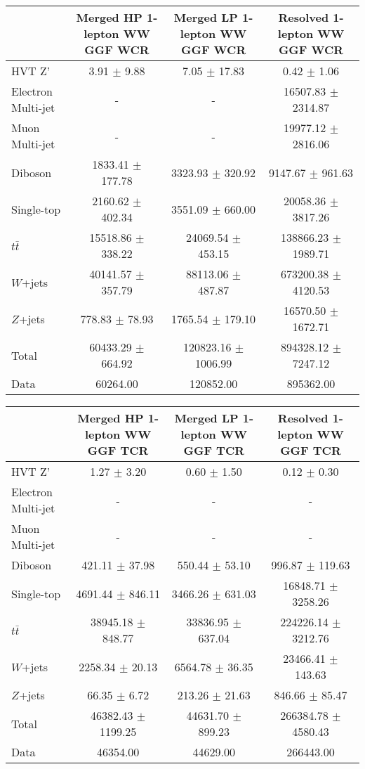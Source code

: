 
\begin{tabular}{|l|c|c|c|}
\hline
	  &	Merged HP 1-lepton WW GGF WCR &	Merged LP 1-lepton WW GGF WCR &	Resolved 1-lepton WW GGF WCR \\\hline 
	HVT Z' &	3.91 $\pm$ 9.88 &	7.05 $\pm$ 17.83 &	0.42 $\pm$ 1.06 \\\hline 
	Electron Multi-jet &	- &	- &	16507.83 $\pm$ 2314.87 \\\hline 
	Muon Multi-jet &	- &	- &	19977.12 $\pm$ 2816.06 \\\hline 
	Diboson &	1833.41 $\pm$ 177.78 &	3323.93 $\pm$ 320.92 &	9147.67 $\pm$ 961.63 \\\hline 
	Single-top &	2160.62 $\pm$ 402.34 &	3551.09 $\pm$ 660.00 &	20058.36 $\pm$ 3817.26 \\\hline 
	$t\bar{t}$ &	15518.86 $\pm$ 338.22 &	24069.54 $\pm$ 453.15 &	138866.23 $\pm$ 1989.71 \\\hline 
	$W$+jets &	40141.57 $\pm$ 357.79 &	88113.06 $\pm$ 487.87 &	673200.38 $\pm$ 4120.53 \\\hline 
	$Z$+jets &	778.83 $\pm$ 78.93 &	1765.54 $\pm$ 179.10 &	16570.50 $\pm$ 1672.71 \\\hline 
	Total &	60433.29 $\pm$ 664.92 &	120823.16 $\pm$ 1006.99 &	894328.12 $\pm$ 7247.12 \\\hline 
	Data &	60264.00 &	120852.00 &	895362.00 \\\hline 
\end{tabular}

\begin{tabular}{|l|c|c|c|}
\hline
	  &	Merged HP 1-lepton WW GGF TCR &	Merged LP 1-lepton WW GGF TCR &	Resolved 1-lepton WW GGF TCR \\\hline 
	HVT Z' &	1.27 $\pm$ 3.20 &	0.60 $\pm$ 1.50 &	0.12 $\pm$ 0.30 \\\hline 
	Electron Multi-jet &	- &	- &	- \\\hline 
	Muon Multi-jet &	- &	- &	- \\\hline 
	Diboson &	421.11 $\pm$ 37.98 &	550.44 $\pm$ 53.10 &	996.87 $\pm$ 119.63 \\\hline 
	Single-top &	4691.44 $\pm$ 846.11 &	3466.26 $\pm$ 631.03 &	16848.71 $\pm$ 3258.26 \\\hline 
	$t\bar{t}$ &	38945.18 $\pm$ 848.77 &	33836.95 $\pm$ 637.04 &	224226.14 $\pm$ 3212.76 \\\hline 
	$W$+jets &	2258.34 $\pm$ 20.13 &	6564.78 $\pm$ 36.35 &	23466.41 $\pm$ 143.63 \\\hline 
	$Z$+jets &	66.35 $\pm$ 6.72 &	213.26 $\pm$ 21.63 &	846.66 $\pm$ 85.47 \\\hline 
	Total &	46382.43 $\pm$ 1199.25 &	44631.70 $\pm$ 899.23 &	266384.78 $\pm$ 4580.43 \\\hline 
	Data &	46354.00 &	44629.00 &	266443.00 \\\hline 
\end{tabular}


